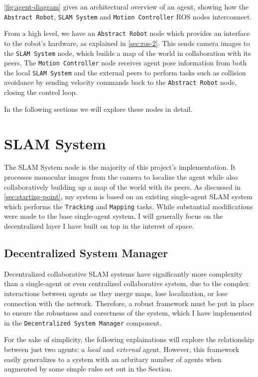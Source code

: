 \autoref{fig:agent-diagram} gives an architectural overview of an agent, showing how the \texttt{Abstract Robot}, \texttt{SLAM System} and \texttt{Motion Controller} ROS nodes interconnect.

From a high level, we have an \texttt{Abstract Robot} node which provides an interface to the robot's hardware, as explained in \autoref{sec:ros-2}. This sends camera images to the \texttt{SLAM System} node, which builds a map of the world in collaboration with its peers. The \texttt{Motion Controller} node receives agent pose information from both the local \texttt{SLAM System} and the external peers to perform tasks such as collision avoidance by sending velocity commands back to the \texttt{Abstract Robot} node, closing the control loop.

In the following sections we will explore these nodes in detail.

\section{SLAM System}
\label{sec:slam-system}
The SLAM System node is the majority of this project's implementation. It processes monocular images from the camera to localize the agent while also collaboratively building up a map of the world with its peers. As discussed in \autoref{sec:starting-point}, my system is based on an existing single-agent SLAM system which performs the \texttt{Tracking} and \texttt{Mapping} tasks. While substantial modifications were made to the base single-agent system, I will generally focus on the decentralized layer I have built on top in the interest of space.

\subsection{Decentralized System Manager}
\label{sec:decentralized-system-manager}
Decentralized collaborative SLAM systems have significantly more complexity than a single-agent or even centralized collaborative system, due to the complex interactions between agents as they merge maps, lose localization, or lose connection with the network. Therefore, a robust framework must be put in place to ensure the robustness and corectness of the system, which I have implemented in the \texttt{Decentralized System Manager} component.

For the sake of simplicity, the following explainations will explore the relationship between just two agents: a \textit{local} and \textit{external} agent. However, this framework easily generalizes to a system with an arbritary number of agents when augmented by some simple rules set out in the \textit{} Section.

